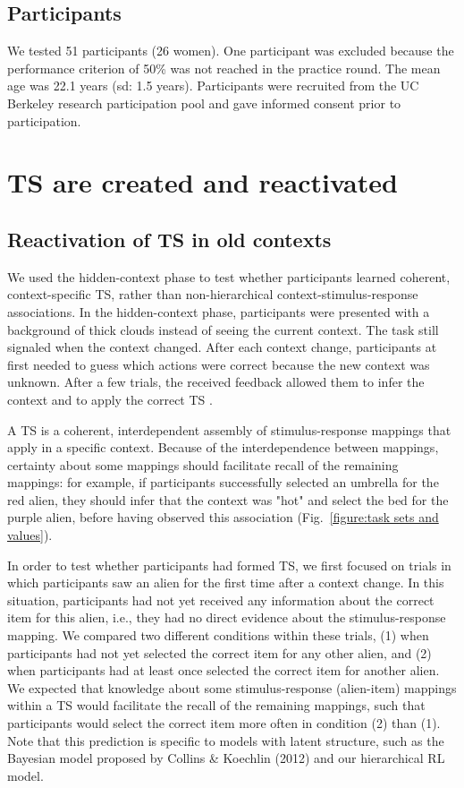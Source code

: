 \documentclass[10pt, letterpaper]{article}
\begin{document}
\subsection{Participants}

We tested 51 participants (26 women). One participant was excluded because the performance criterion of 50\% was not reached in the practice round. The mean age was 22.1 years (sd: 1.5 years). Participants were recruited from the UC Berkeley research participation pool and gave informed consent prior to participation. 


\section{TS are created and reactivated}

\subsection{Reactivation of TS in old contexts}

We used the hidden-context phase to test whether participants learned coherent, context-specific TS, rather than non-hierarchical context-stimulus-response associations. In the hidden-context phase, participants were presented with a background of thick clouds instead of seeing the current context. The task still signaled when the context changed. After each context change, participants at first needed to guess which actions were correct because the new context was unknown. After a few trials, the received feedback allowed them to infer the context and to apply the correct TS \cite{collins_reasoning_2012}.

A TS is a coherent, interdependent assembly of stimulus-response mappings that apply in a specific context. Because of the interdependence between mappings, certainty about some mappings should facilitate recall of the remaining mappings: for example, if participants successfully selected an umbrella for the red alien, they should infer that the context was "hot" and select the bed for the purple alien, before having observed this association (Fig.~\ref{figure:task sets and values}).

In order to test whether participants had formed TS, we first focused on trials in which participants saw an alien for the first time after a context change. In this situation, participants had not yet received any information about the correct item for this alien, i.e., they had no direct evidence about the stimulus-response mapping. We compared two different conditions within these trials, (1) when participants had not yet selected the correct item for any other alien, and (2) when participants had at least once selected the correct item for another alien. We expected that knowledge about some stimulus-response (alien-item) mappings within a TS would facilitate the recall of the remaining mappings, such that participants would select the correct item more often in condition (2) than (1). Note that this prediction is specific to models with latent structure, such as the Bayesian model proposed by Collins \& Koechlin (2012) and our hierarchical RL model.
\end{document}
